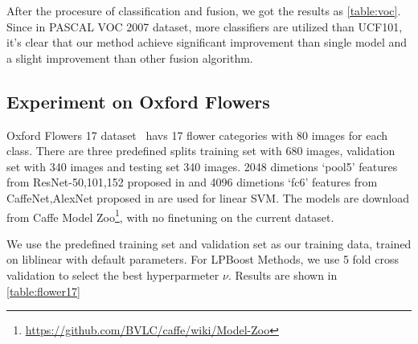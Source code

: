 \documentclass[letterpaper]{article}
\begin{document}
After the procesure of classification and fusion, we got the results as \ref{table:voc}. Since in PASCAL VOC 2007 dataset, more classifiers are utilized than UCF101, it's clear that our method achieve significant improvement than single model and a slight improvement than other fusion algorithm.

\subsection{Experiment on Oxford Flowers}
Oxford Flowers 17 dataset~\cite{nilsback2006visual} havs 17 flower categories with 80 images for each class. There are three predefined splits training set with 680 images, validation set with 340 images and testing set 340 images. 2048 dimetions `pool5' features from ResNet-50,101,152 proposed in \cite{he2015deep} and 4096 dimetions `fc6' features from CaffeNet,AlexNet proposed in \cite{krizhevsky2012imagenet} are used for linear SVM. The models are download from Caffe Model Zoo\footnote{\url{https://github.com/BVLC/caffe/wiki/Model-Zoo}}, with no finetuning on the current dataset.

We use the predefined training set and validation set as our training data, trained on liblinear with default parameters. For LPBoost Methods, we use 5 fold cross validation to select the best hyperparmeter $\nu$.
Results are shown in \ref{table:flower17}

\fi


\begin{quote}
\begin{small}
  
  
\end{small}
\end{quote}
\end{document}
